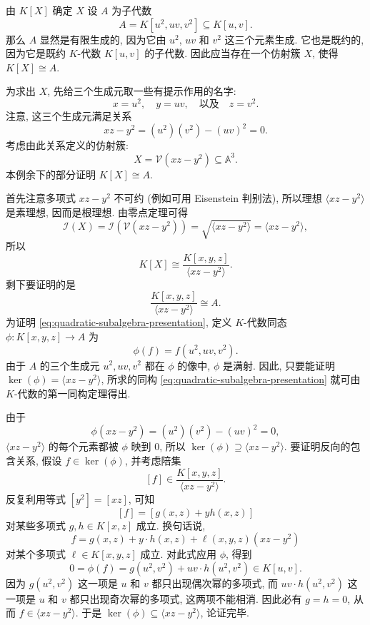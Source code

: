 \begin{Example}{{由 \textmd{$K[X]$} 确定 $X$}}\leavevmode\label{ex:coordinate-ring-of-quadratic-subalgebra}
  设 $A$ 为子代数
  \[
    A=K[u^{2},uv,v^{2}]\subseteq K[u,v].
  \]
  那么 $A$ 显然是有限生成的, 因为它由 $u^{2}$, $uv$ 和 $v^{2}$ 这三个元素生成. 它也是既约的, 因为它是既约 $K$-代数 $K[u,v]$ 的子代数. 因此应当存在一个仿射簇 $X$, 使得 $K[X]\cong A$.

  为求出 $X$, 先给三个生成元取一些有提示作用的名字:
  \[
    x=u^{2},\quad y=uv,\quad\text{以及}\quad z=v^{2}.
  \]
  注意, 这三个生成元满足关系
  \[
    xz-y^{2}=(u^{2})(v^{2})-(uv)^{2}=0.
  \]
  考虑由此关系定义的仿射簇:
  \[
    X=\mathcal{V}(xz-y^{2})\subseteq\mathbb{A}^{3}.
  \]
  本例余下的部分证明 $K[X]\cong A$.

  首先注意多项式 $xz-y^{2}$ 不可约 (例如可用 Eisenstein 判别法), 所以理想 $\langle xz-y^{2}\rangle$ 是素理想, 因而是根理想. 由零点定理可得
  \[
    \mathcal{I}(X)=\mathcal{I}(\mathcal{V}(xz-y^{2}))
      =\sqrt{\langle xz-y^{2}\rangle}=\langle xz-y^{2}\rangle,
  \]
  所以
  \[
    K[X]\cong\frac{K[x,y,z]}{\langle xz-y^{2}\rangle}.
  \]
  剩下要证明的是
  \begin{equation}\label{eq:quadratic-subalgebra-presentation}
    \frac{K[x,y,z]}{\langle xz-y^{2}\rangle}\cong A.
  \end{equation}
  为证明 \eqref{eq:quadratic-subalgebra-presentation}, 定义 $K$-代数同态 $\phi:K[x,y,z]\to A$ 为
  \[
    \phi(f)=f(u^{2},uv,v^{2}).
  \]
  由于 $A$ 的三个生成元 $u^{2},uv,v^{2}$ 都在 $\phi$ 的像中, $\phi$ 是满射. 因此, 只要能证明 $\ker(\phi)=\langle xz-y^{2}\rangle$, 所求的同构 \eqref{eq:quadratic-subalgebra-presentation} 就可由 $K$-代数的第一同构定理得出.

  由于
  \[
    \phi(xz-y^{2})=(u^{2})(v^{2})-(uv)^{2}=0,
  \]
  $\langle xz-y^{2}\rangle$ 的每个元素都被 $\phi$ 映到 $0$, 所以 $\ker(\phi)\supseteq\langle xz-y^{2}\rangle$. 要证明反向的包含关系, 假设 $f\in\ker(\phi)$, 并考虑陪集
  \[
    [f]\in\frac{K[x,y,z]}{\langle xz-y^{2}\rangle}.
  \]
  反复利用等式 $[y^{2}]=[xz]$, 可知
  \[
    [f]=[g(x,z)+yh(x,z)]
  \]
  对某些多项式 $g,h\in K[x,z]$ 成立. 换句话说,
  \[
    f=g(x,z)+y\cdot h(x,z)+\ell(x,y,z)(xz-y^{2})
  \]
  对某个多项式 $\ell\in K[x,y,z]$ 成立. 对此式应用 $\phi$, 得到
  \[
    0=\phi(f)=g(u^{2},v^{2})+uv\cdot h(u^{2},v^{2})\in K[u,v].
  \]
  因为 $g(u^{2},v^{2})$ 这一项是 $u$ 和 $v$ 都只出现偶次幂的多项式, 而 $uv\cdot h(u^{2},v^{2})$ 这一项是 $u$ 和 $v$ 都只出现奇次幂的多项式, 这两项不能相消. 因此必有 $g=h=0$, 从而 $f\in\langle xz-y^{2}\rangle$. 于是 $\ker(\phi)\subseteq\langle xz-y^{2}\rangle$, 论证完毕.
\end{Example}

